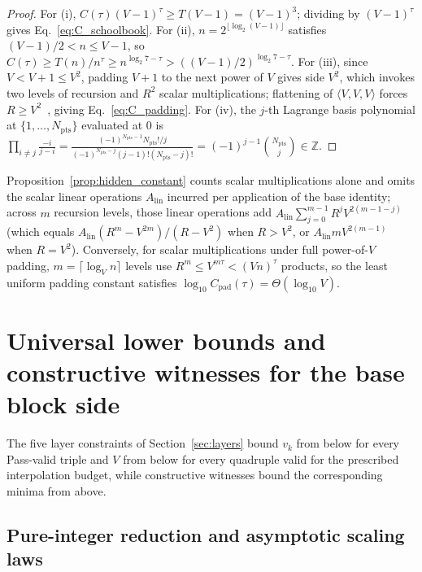 \documentclass[11pt,a4paper]{article}
\theoremstyle{plain}
\theoremstyle{definition}
\theoremstyle{remark}
\newcommand{\Z}{\mathbb{Z}}
\begin{document}
\begin{proof}
For (i), $C(\tau)(V - 1)^\tau \ge T(V - 1) = (V - 1)^3$; dividing by $(V - 1)^\tau$ gives Eq.~\eqref{eq:C_schoolbook}. For (ii), $n = 2^{\lfloor \log_2(V - 1)\rfloor}$ satisfies $(V - 1)/2 < n \le V - 1$, so $C(\tau) \ge T(n)/n^\tau \ge n^{\log_2 7 - \tau} > ((V - 1)/2)^{\log_2 7 - \tau}$. For (iii), since $V < V + 1 \le V^2$, padding $V + 1$ to the next power of $V$ gives side $V^2$, which invokes two levels of recursion and $R^2$ scalar multiplications; flattening of $\langle V, V, V\rangle$ forces $R \ge V^2$~\cite{BCS1997}, giving Eq.~\eqref{eq:C_padding}. For (iv), the $j$-th Lagrange basis polynomial at $\{1, \dots, N_{\mathrm{pts}}\}$ evaluated at $0$ is
$\prod_{i \neq j} \frac{-i}{j - i} = \frac{(-1)^{N_{\mathrm{pts}} - 1} N_{\mathrm{pts}}! / j}{(-1)^{N_{\mathrm{pts}} - j}(j - 1)!(N_{\mathrm{pts}} - j)!} = (-1)^{j - 1}\binom{N_{\mathrm{pts}}}{j} \in \Z$.
\end{proof}

Proposition~\ref{prop:hidden_constant} counts scalar multiplications alone and omits the scalar linear operations $A_{\mathrm{lin}}$ incurred per application of the base identity; across $m$ recursion levels, those linear operations add $A_{\mathrm{lin}}\sum_{j=0}^{m-1} R^j V^{2(m-1-j)}$ (which equals $A_{\mathrm{lin}}(R^m - V^{2m})/(R - V^2)$ when $R > V^2$, or $A_{\mathrm{lin}} m V^{2(m-1)}$ when $R = V^2$). Conversely, for scalar multiplications under full power-of-$V$ padding, $m = \lceil \log_V n\rceil$ levels use $R^m \le V^{m\tau} < (V n)^\tau$ products, so the least uniform padding constant satisfies $\log_{10} C_{\mathrm{pad}}(\tau) = \Theta(\log_{10} V)$.

\section{Universal lower bounds and constructive witnesses for the base block side}
\label{sec:bounds}

The five layer constraints of Section~\ref{sec:layers} bound $v_k$ from below for every Pass-valid triple and $V$ from below for every quadruple valid for the prescribed interpolation budget, while constructive witnesses bound the corresponding minima from above.

\subsection{Pure-integer reduction and asymptotic scaling laws}
\label{subsec:universal_theory}
\end{document}
